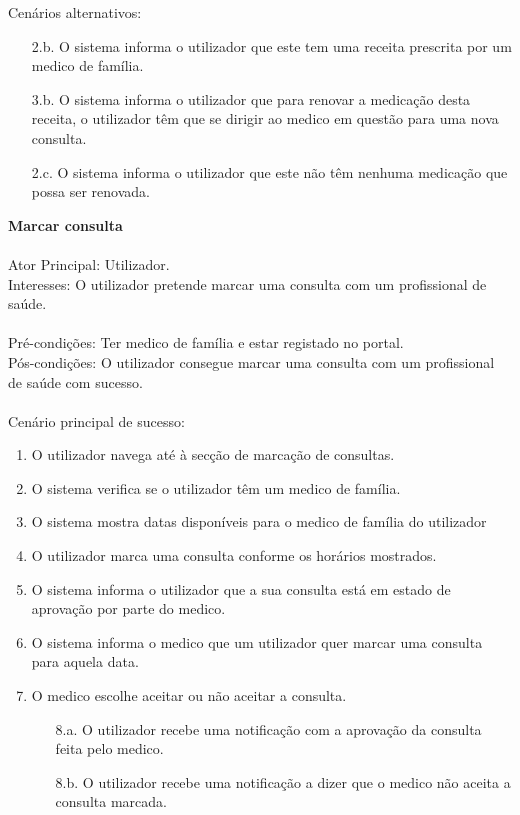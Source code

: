 \documentclass[12pt, a4paper, twoside]{report} %
\begin{document}
\noindent Cenários alternativos:
	\begin{enumerate}
	\item [2.b.] O sistema informa o utilizador que este tem uma receita prescrita por um medico de família.
	\item [3.b.] O sistema informa o utilizador que para renovar a medicação desta receita, o utilizador têm que se dirigir ao medico em questão para uma nova consulta.
	\item [2.c.] O sistema informa o utilizador que este não têm nenhuma medicação que possa ser renovada.
	\end{enumerate}

\noindent\textbf{Marcar consulta}
\\
\\
Ator Principal: Utilizador.\\
Interesses: O utilizador pretende marcar uma consulta com um profissional de saúde.\\
\\
Pré-condições: Ter medico de família e estar registado no portal.\\
Pós-condições: O utilizador consegue marcar uma consulta com um profissional de saúde com sucesso.\\
\\
Cenário principal de sucesso:
	\begin{enumerate}
	\item O utilizador navega até à secção de marcação de consultas.
	\item O sistema verifica se o utilizador têm um medico de família.
	\item O sistema mostra datas disponíveis para o medico de família do utilizador
	\item O utilizador marca uma consulta conforme os horários mostrados.
	\item O sistema informa o utilizador que a sua consulta está em estado de aprovação por parte do medico.
	\item O sistema informa o medico que um utilizador quer marcar uma consulta para aquela data.
	\item O medico escolhe aceitar ou não aceitar a consulta.
		\begin{enumerate}
		\item [8.a.] O utilizador recebe uma notificação com a aprovação da consulta feita pelo medico.
		\item [8.b.] O utilizador recebe uma notificação a dizer que o medico não aceita a consulta marcada.
		\end{enumerate}
	\end{enumerate}
\end{document}
